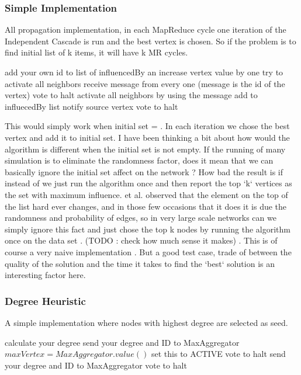 \documentclass[english]{tktltiki}
\begin{document}
\subsubsection{Simple Implementation}
All propagation implementation, in each MapReduce cycle one iteration of the Independent Cascade is run and the best vertex is chosen. So if the problem is to find initial list of k items, it will have k MR cycles.
\begin{algorithm}
\begin{algorithmic}
	\State add your own id to list of influencedBy an increase vertex value by one
	\State try to activate all neighbors 
\Else
	\State receive message from every one (message is the id of the vertex)
			\State vote to halt
		\Else
			\State activate all neighbors by using the message
			\State add to influecedBy list
			\State notify source vertex
			\State vote to halt
		\EndIf
		
	\EndFor
\EndIf
\end{algorithmic}
\end{algorithm}

This would simply work when initial set = {}. In each iteration we chose the best vertex and add it to initial set. 
I have been thinking a bit about how would the algorithm is different when the initial set is not empty. If the running of many simulation is to eliminate
the randomness factor, does it mean that we can basically ignore the initial set affect on the network ? \newline
How bad the result is if instead of we just run the algorithm once and then report the top `k` vertices as the set with maximum influence. 
\cite{Leskovec07} et al. observed that the element on the top of the list hard ever changes, and in those few occasions that it does it is due the randomness and probability of edges, so in very large scale networks can we simply ignore this fact and just chose the top k nodes by running the algorithm once on the data set . (TODO : check how much sense it makes) . This is of course a very naive implementation . But a good test case, trade of between the quality of the solution and the time it takes to find the `best` solution is an interesting factor here. 



\subsubsection{Degree Heuristic}
A simple implementation where nodes with highest degree are selected as seed.
\begin{algorithm}
\begin{algorithmic}
	\State calculate your degree
	\State send your degree and ID to MaxAggregator
	\State $maxVertex=MaxAggregator.value()$
		\State set this to ACTIVE
		\State vote to halt
	\Else
		\State send your degree and ID to MaxAggregator
	\EndIf
\Else
	\State vote to halt
\EndIf
\end{algorithmic}
\end{algorithm}
\end{document}
